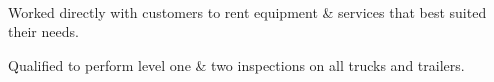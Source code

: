 \documentclass[]{hieudo-build}
\begin{document}
\begin{minipage}[t]{0.65\textwidth}
 \\
\begin{tightemize}
\item Worked directly with customers to rent equipment \& services that best suited their needs.
\item Qualified to perform level one \& two inspections on all trucks and trailers.
\end{tightemize}
\sectionsep





\end{minipage} 
\end{document}
